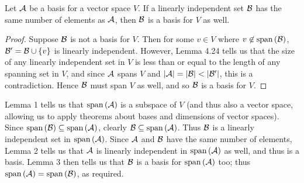 \documentclass{homework}
\begin{document}
\begin{solution}
  
  \begin{lemma}{}
    Let $\mathcal{A}$ be a basis for a vector space $V$. If a linearly independent set $\mathcal{B}$ has the
    same number of elements as $\mathcal{A}$, then $\mathcal{B}$ is a basis for $V$ as well.
  \end{lemma}
  \begin{proof}[Proof]
    Suppose $\mathcal{B}$ is not a basis for $V$. Then for some $v\in V$ where $v\not\in
    \operatorname{span}{(\mathcal{B})}$, $\mathcal{B}'=\mathcal{B}\cup \{ v \}$ is linearly independent. However, Lemma 4.24
    tells us that the size of any linearly independent set in $V$ is less than or equal to the
    length of any spanning set in $V$, and since $\mathcal{A}$ spans $V$ and $\left| \mathcal{A} \right| =
    \left| \mathcal{B} \right| < \left| \mathcal{B}' \right| $, this is a contradiction. Hence $\mathcal{B}$ must
    span $V$ as well, and so $\mathcal{B}$ is a basis for $V$.
  \end{proof}

  Lemma 1 tells us that $\operatorname{span}{(\mathcal{A})}$ is a subspace of $V$ (and thus also a vector space,
  allowing us to apply theorems about bases and dimensions of vector spaces). Since
  $\operatorname{span}{(\mathcal{B})}\subseteq \operatorname{span}{(\mathcal{A})}$, clearly $\mathcal{B}\subseteq \operatorname{span}{(\mathcal{A})}$. Thus
  $\mathcal{B}$ is a linearly independent set in $\operatorname{span}{(\mathcal{A})}$. Since $\mathcal{A}$ and $\mathcal{B}$ have the
  same number of elements, Lemma 2 tells us that $\mathcal{A}$ is linearly independent in
  $\operatorname{span}{(\mathcal{A})}$ as well, and thus is a basis. Lemma 3 then tells us that $\mathcal{B}$ is a basis for
  $\operatorname{span}{(\mathcal{A})}$ too; thus $\operatorname{span}{(\mathcal{A})} = \operatorname{span}{(\mathcal{B})}$, as required.
  
\end{solution}
\end{document}
